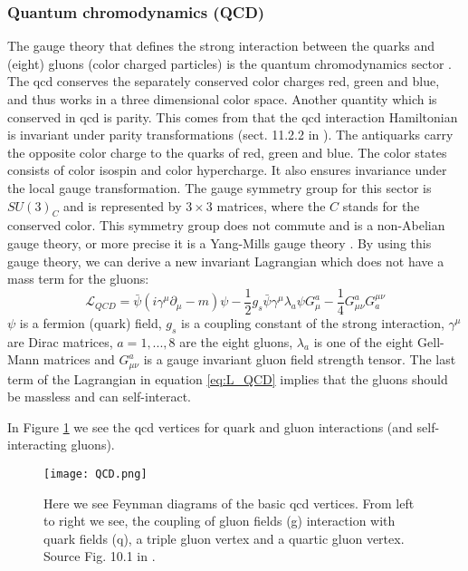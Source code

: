 \documentclass[a4paper, american, 12pt]{report}
\begin{document}
	\subsubsection{Quantum chromodynamics (QCD)}
	\label{subsubsect:Theory-QCD}
	The gauge theory that defines the strong interaction between the quarks and (eight) gluons (color charged particles) is the quantum chromodynamics sector \cite{QCD}. The \acrshort{qcd} conserves the separately conserved color charges red, green and blue, and thus works in a three dimensional color space. Another quantity which is conserved in \acrshort{qcd} is parity. This comes from that the \acrshort{qcd} interaction Hamiltonian is invariant under parity transformations (sect. 11.2.2 in \citet{thomson2013modern}). The antiquarks carry the opposite color charge to the quarks of red, green and blue. The color states consists of color isospin and color hypercharge. It also ensures invariance under the local gauge transformation. The gauge symmetry group for this sector is $SU(3)_C$ and is represented by $3\times3$ matrices, where the $C$ stands for the conserved color. This symmetry group does not commute and is a non-Abelian gauge theory, or more precise it is a Yang-Mills gauge theory \cite{Yang-Mills}. By using this gauge theory, we can derive a new invariant Lagrangian which does not have a mass term for the gluons:
	\begin{equation}
	\label{eq:L_QCD}
		\mathcal{L}_{QCD}=\bar{\psi}(i\gamma^{\mu}\partial_{\mu}-m)\psi -\frac{1}{2}g_s\bar{\psi}\gamma^{\mu}\lambda_a\psi G_{\mu}^a -\frac{1}{4}G_{\mu\nu}^aG_a^{\mu\nu}
	\end{equation}
	$\psi$ is a fermion (quark) field, $g_s$ is a coupling constant of the strong interaction, $\gamma^{\mu}$ are Dirac matrices, $a=1,...,8$ are the eight gluons, $\lambda_a$ is one of the eight Gell-Mann matrices and $G_{\mu\nu}^a$ is a gauge invariant gluon field strength tensor. The last term of the Lagrangian in equation \ref{eq:L_QCD} implies that the gluons should be massless and can self-interact. 
	
	In Figure \ref{fig:QCD} we see the \acrshort{qcd} vertices for quark and gluon interactions (and self-interacting gluons).
	
	\begin{figure}[htbp!]
		\centering\texttt{[image: QCD.png]}
		\caption[\acrshort{qcd} vertex Feynman diagrams.]{Here we see Feynman diagrams of the basic \acrshort{qcd} vertices. From left to right we see, the coupling of gluon fields (g) interaction with quark fields (q), a triple gluon vertex and a quartic gluon vertex. Source Fig. 10.1 in \citet{thomson2013modern}. \label{fig:QCD}}
	\end{figure}
	
\end{document}
